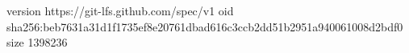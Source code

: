 version https://git-lfs.github.com/spec/v1
oid sha256:beb7631a31d1f1735ef8e20761dbad616c3ccb2dd51b2951a940061008d2bdf0
size 1398236
